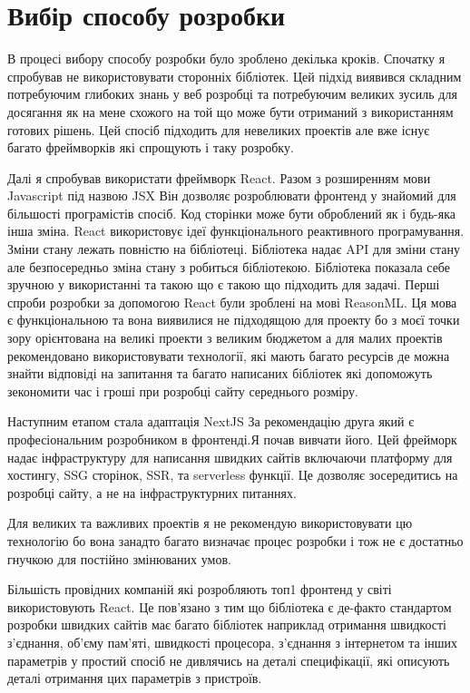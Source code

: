 \newpage
\section{Вибір способу розробки}
В процесі вибору способу розробки було зроблено декілька кроків.
Спочатку я спробував не використовувати сторонніх бібліотек.
Цей підхід виявився складним потребуючим глибоких знань у веб розробці та потребуючим великих зусиль для досягання
як на мене схожого на той що може бути отриманий з використанням готових рішень.
Цей спосіб підходить для невеликих проектів але вже існує багато фреймворків які спрощують і таку розробку.

Далі я спробував використати фреймворк React.
Разом з розширенням мови Javascript під назвою JSX Він дозволяє розроблювати фронтенд у знайомий для більшості програмістів спосіб.
Код сторінки може бути оброблений як і будь-яка інша зміна.
React використовує ідеї функціонального реактивного програмування.
Зміни стану лежать повністю на бібліотеці.
Бібліотека надає API для зміни стану але безпосередньо зміна стану з робиться бібліотекою.
Бібліотека показала себе зручною у використанні та такою що є такою що підходить для задачі.
Перші спроби розробки за допомогою React були зроблені на мові ReasonML.
Ця мова є функціональною та вона виявилися не підходящою для проекту бо з моєї точки зору орієнтована
на великі проекти з великим бюджетом а для малих проектів рекомендовано використовувати технології,
які мають багато ресурсів де можна знайти відповіді на запитання та багато написаних
бібліотек які допоможуть зекономити час і гроші при розробці сайту середнього розміру.

Наступним етапом стала адаптація NextJS За рекомендацію друга який є професіональним розробником в фронтенді.Я почав вивчати його.
Цей фрейморк надає інфраструктуру для написання швидких сайтів включаючи платформу для хостингу, SSG сторінок, SSR, та serverless функції.
Це дозволяє зосередитись на розробці сайту, а не на інфраструктурних питаннях.

Для великих та важливих проектів я не рекомендую використовувати цю технологію бо вона занадто
багато визначає процес розробки і тож не є достатньо гнучкою для постійно змінюваних умов.

Більшість провідних компаній які розробляють топ1 фронтенд у світі використовують React.
Це пов'язано з тим що бібліотека є де-факто стандартом розробки швидких сайтів має багато
бібліотек наприклад отримання швидкості з'єднання, об'єму пам'яті, швидкості процесора,
з'єднання з інтернетом та інших параметрів у простий спосіб не дивлячись на деталі специфікації,
які описують деталі отримання цих параметрів з пристроїв.
